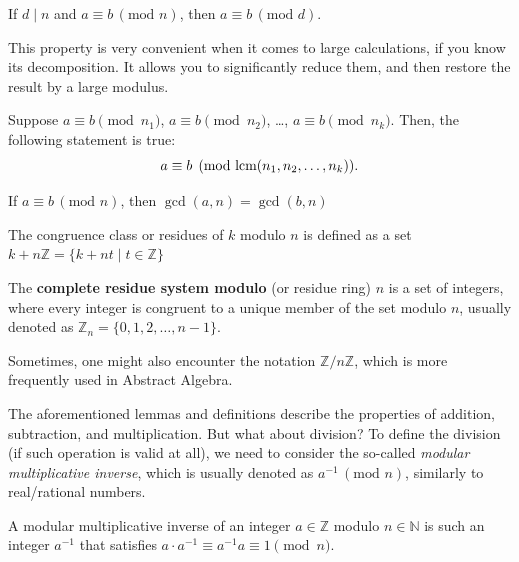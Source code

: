 \documentclass[../lecture-notes.tex]{subfiles}
\begin{document}
\begin{lemma}
    If $d \mid n$ and $a \equiv b \, (\text{mod } n)$, then $a \equiv b \, (\text{mod } d)$.
\end{lemma}

This property is very convenient when it comes to large calculations, if you know its decomposition.
It allows you to significantly reduce them, and then restore the result by a large modulus.

\begin{lemma}
    Suppose $a \equiv b \pmod{n_1}$, $a \equiv b \pmod{n_2}$, \ldots, $a \equiv b \pmod{n_k}$. Then, the following statement is true: 
    \begin{equation*}
        a \equiv b \pmod{\text{lcm}(n_1, n_2, \dots, n_k)}.
    \end{equation*}
\end{lemma}

\begin{lemma}
    If $a \equiv b \, (\text{mod } n)$, then $\gcd(a, n) = \gcd(b, n)$
\end{lemma}

\begin{definition}
    The congruence class or residues of $k$ modulo $n$ is defined as a set $k + n\mathbb{Z} = \{ k + nt \mid t \in \mathbb{Z}\}$    
\end{definition}

\begin{definition}
    The \textbf{complete residue system modulo} (or residue ring) $n$ is a set of integers, where
    every integer is congruent to a unique member of the set modulo $n$, usually denoted
    as $\mathbb{Z}_n = \{0, 1, 2, \dots, n-1\}$.
\end{definition}

\begin{remark}
    Sometimes, one might also encounter the notation $\mathbb{Z}/n\mathbb{Z}$, which is more frequently used in Abstract Algebra.
\end{remark}

The aforementioned lemmas and definitions describe the properties of addition, subtraction, and multiplication. But what about division? To define the division (if such operation is valid at all), we need to consider the so-called \emph{modular multiplicative inverse}, which is usually denoted as $a^{-1} \, (\text{mod } n)$, similarly to real/rational numbers.

\begin{definition}
    A modular multiplicative inverse of an integer $a \in \mathbb{Z}$ modulo $n \in \mathbb{N}$ is such an integer $a^{-1}$ that satisfies $a \cdot a^{-1} \equiv a^{-1}a \equiv 1 \pmod{n}$.
\end{definition}
\end{document}
